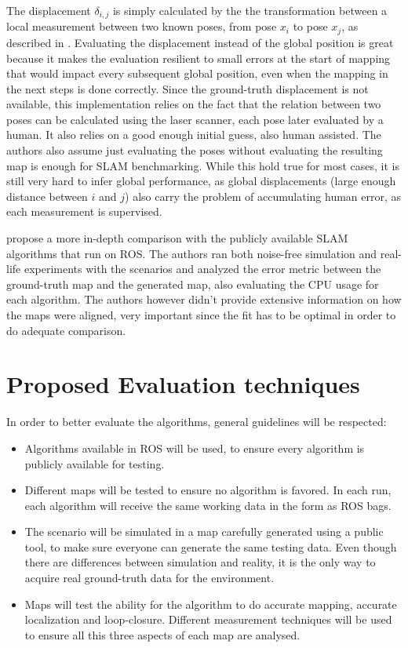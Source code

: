  The displacement $\delta_{i, j}$ is simply calculated by the the transformation between a local measurement between two known poses, from pose $x_i$ to pose $x_j$, as described in . Evaluating the displacement instead of the global position is great because it makes the evaluation resilient to small errors at the start of mapping that would impact every subsequent global position, even when the mapping in the next steps is done correctly. Since the ground-truth displacement is not available, this implementation relies on the fact that the relation between two poses can be calculated using the laser scanner, each pose later evaluated by a human. It also relies on a good enough initial guess, also human assisted. The authors also assume just evaluating the poses without evaluating the resulting map is enough for SLAM benchmarking. While this hold true for most cases, it is still very hard to infer global performance, as global displacements (large enough distance between $i$ and $j$) also carry the problem of accumulating human error, as each measurement is supervised.
 
 \citeauthor{santos2013evaluation} propose a more in-depth comparison with the publicly available SLAM algorithms that run on ROS. The authors ran both noise-free simulation and real-life experiments with the scenarios and analyzed the error metric between the ground-truth map and the generated map, also evaluating the CPU usage for each algorithm. The authors however didn't provide extensive information on how the maps were aligned, very important since the fit has to be optimal in order to do adequate comparison.
 
 \section{Proposed Evaluation techniques}
 
 In order to better evaluate the algorithms, general guidelines will be respected:
 
 \begin{itemize}
     \item Algorithms available in ROS will be used, to ensure every algorithm is publicly available for testing.
     \item Different maps will be tested to ensure no algorithm is favored. In each run, each algorithm will receive the same working data in the form as ROS bags.
     \item The scenario will be simulated in a map carefully generated using a public tool, to make sure everyone can generate the same testing data. Even though there are differences between simulation and reality, it is the only way to acquire real ground-truth data for the environment.
     \item Maps will test the ability for the algorithm to do accurate mapping, accurate localization and loop-closure. Different measurement techniques will be used to ensure all this three aspects of each map are analysed.
 \end{itemize}
 
